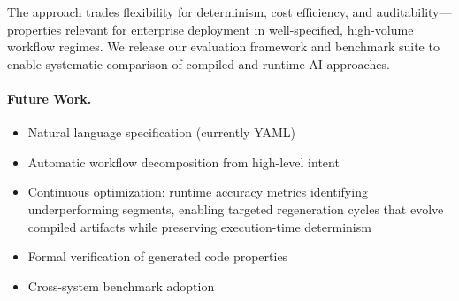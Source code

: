 \documentclass[11pt]{article}
\begin{document}
The approach trades flexibility for determinism, cost efficiency, and auditability—properties relevant for enterprise deployment in well-specified, high-volume workflow regimes. We release our evaluation framework and benchmark suite to enable systematic comparison of compiled and runtime AI approaches.

\paragraph{Future Work.}
\begin{itemize}
    \item Natural language specification (currently YAML)
    \item Automatic workflow decomposition from high-level intent
    \item Continuous optimization: runtime accuracy metrics identifying underperforming segments, enabling targeted regeneration cycles that evolve compiled artifacts while preserving execution-time determinism
    \item Formal verification of generated code properties
    \item Cross-system benchmark adoption
\end{itemize}



\end{document}
